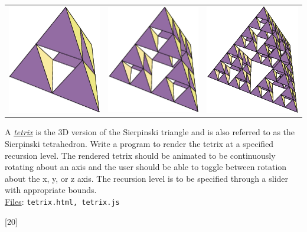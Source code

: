 \documentclass[addpoints]{exam}
\begin{document}
\begin{questions}
  \begin{tabular}{ccc}
    \includegraphics[width=.3\textwidth]{tetrix1}
    & \includegraphics[width=.3\textwidth]{tetrix2}
    & \includegraphics[width=.3\textwidth]{tetrix3}
  \end{tabular}
  A \href{http://mathworld.wolfram.com/Tetrix.html}{\it tetrix} is the 3D version of the Sierpinski triangle and is also referred to as the Sierpinski tetrahedron. Write a program to render the tetrix at a specified recursion level. The rendered tetrix should be animated to be continuously rotating about an axis and the user should be able to toggle between rotation about the x, y, or z axis. The recursion level is to be specified through a slider with appropriate bounds.
  \\\noindent\underline{Files}: {\tt tetrix.html, tetrix.js}

  \newpage
  [20]
  \label{q:galore}
  

\end{questions}
\end{document}
